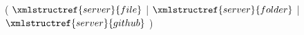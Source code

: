 ( $\xmlstructref{server}{file}$ | $\xmlstructref{server}{folder}$ | $\xmlstructref{server}{github}$ )
